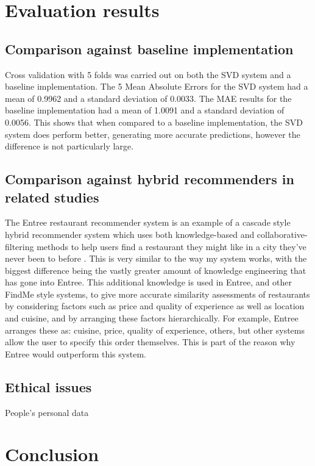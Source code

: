 \documentclass[conference]{IEEEtran}
\begin{document}
\section{Evaluation results}

\subsection{Comparison against baseline implementation}
Cross validation with 5 folds was carried out on both the SVD system and a baseline implementation. 
The 5 Mean Absolute Errors for the SVD system had a mean of 0.9962 and a standard deviation of 0.0033. 
The MAE results for the baseline implementation had a mean of 1.0091 and a standard deviation of 0.0056. 
This shows that when compared to a baseline implementation, the SVD system does perform better, generating more 
accurate predictions, however the difference is not particularly large. 

\subsection{Comparison against hybrid recommenders in related studies}
The Entree restaurant recommender system is an example of a cascade style hybrid recommender system which 
uses both knowledge-based and collaborative-filtering methods to help users find a restaurant they might like in 
a city they've never been to before \cite{burke1999integrating,burke2000knowledge,burke2002hybrid,burke2007hybrid}. 
This is very similar to the way my system works, with the biggest difference being the vastly greater amount of 
knowledge engineering that has gone into Entree. 
This additional knowledge is used in Entree, and other FindMe style systems, to give more accurate similarity assessments 
of restaurants by considering factors such as price and quality of experience as well as location and cuisine, 
and by arranging these factors hierarchically. 
For example, Entree arranges these as: cuisine, price, quality of experience, others, but other systems allow the 
user to specify this order themselves. 
This is part of the reason why Entree would outperform this system. 

\subsection{Ethical issues}
People's personal data


\section{Conclusion}
\end{document}
